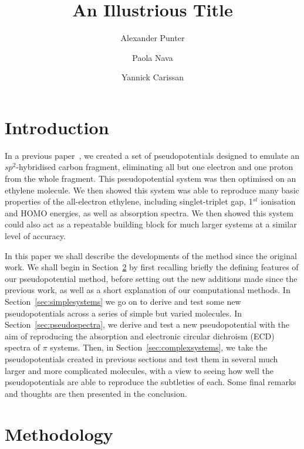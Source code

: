 \documentclass[aip,reprint,nofootinbib]{revtex4-1}
\begin{document}
\title{An Illustrious Title}
\author{Alexander Punter}
\author{Paola Nava}
\author{Yannick Carissan}

\maketitle

\section{Introduction}

In a previous paper~\cite{punter2019atomic}, we created a set of pseudopotentials designed to emulate an $sp^2$-hybridised carbon fragment, eliminating all but one electron and one proton from the whole fragment. This pseudopotential system was then optimised on an ethylene molecule. We then showed this system was able to reproduce many basic properties of the all-electron ethylene, including singlet-triplet gap, 1$^{st}$ ionisation and HOMO energies, as well as absorption spectra. We then showed this system could also act as a repeatable building block for much larger systems at a similar level of accuracy. 

In this paper we shall describe the developments of the method since the original work. We shall begin in Section~\ref{sec:methodology} by first recalling briefly the defining features of our pseudopotential method, before setting out the new additions made since the previous work, as well as a short explanation of our computational methods. In Section~\ref{sec:simplesystems} we go on to derive and test some new pseudopotentials across a series of simple but varied molecules. In Section~\ref{sec:pseudospectra}, we derive and test a new pseudopotential with the aim of reproducing the absorption and electronic circular dichroism (ECD) spectra of $\pi$ systems. Then, in Section~\ref{sec:complexsystems}, we take the pseudopotentials created in previous sections and test them in several much larger and more complicated molecules, with a view to seeing how well the pseudopotentials are able to reproduce the subtleties of each. Some final remarks and thoughts are then presented in the conclusion.

\section{Methodology}
\label{sec:methodology}
\end{document}
